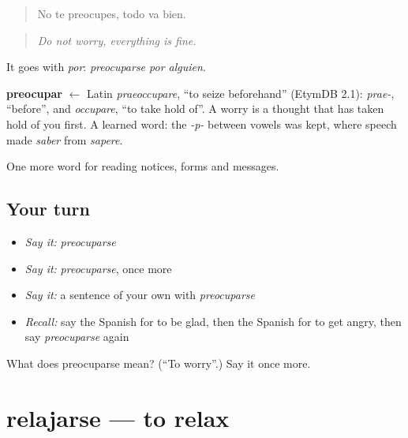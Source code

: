\begin{quote}
No te preocupes, todo va bien.
\end{quote}

\begin{quote}
\emph{Do not worry, everything is fine.}
\end{quote}

It goes with \emph{por}: \emph{preocuparse por alguien}.

\begin{cousinweb}
\textbf{preocupar} $\leftarrow$ Latin \emph{praeoccupare}, \textquotedblleft{}to seize beforehand\textquotedblright{} (EtymDB 2.1): \emph{prae-}, \textquotedblleft{}before\textquotedblright{}, and \emph{occupare}, \textquotedblleft{}to take hold of\textquotedblright{}. A worry is a thought that has taken hold of you first. A learned word: the \emph{-p-} between vowels was kept, where speech made \emph{saber} from \emph{sapere}.
\end{cousinweb}

\begin{grammarlens}[title={What you've built}]
One more word for reading notices, forms and messages.
\end{grammarlens}

\subsection*{Your turn}
\begin{itemize}
\raggedright
  \item \emph{Say it:} \emph{preocuparse}
  \item \emph{Say it:} \emph{preocuparse}, once more
  \item \emph{Say it:} a sentence of your own with \emph{preocuparse}
  \item \emph{Recall:} say the Spanish for to be glad, then the Spanish for to get angry, then say \emph{preocuparse} again
\end{itemize}

\begin{tcolorbox}[breakable,colback=teal!4,colframe=teal!35!black,title={Before you move on}]
What does preocuparse mean? (\textquotedblleft{}To worry\textquotedblright{}.) Say it once more.
\end{tcolorbox}
\section[relajarse]{relajarse — to relax}

